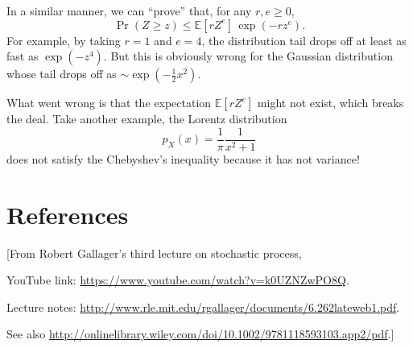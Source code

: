 \documentclass{article}
\begin{document}
In a similar manner, we can ``prove'' that, for any $r, e \ge 0$,
$$
\operatorname{Pr}(Z \ge z)
\le
\mathbb{E}[rZ^e] \, \exp(-rz^e).
$$
For example, by taking $r = 1$ and $e = 4$,
the distribution tail drops off at least as fast as $\exp(-z^4)$.
%
But this is obviously wrong for the Gaussian distribution
whose tail drops off as $\sim \exp\left( -\frac{1}{2} x^2 \right)$.

What went wrong is that the expectation $\mathbb{E}[rZ^e]$
might not exist, which breaks the deal.
%
Take another example, the Lorentz distribution
$$
p_X(x) = \frac{1}{\pi} \frac{1}{x^2 + 1}
$$
does not satisfy the Chebyshev's inequality because
it has not variance!

\section{References}

[From Robert Gallager's third lecture on stochastic process,

YouTube link: \url{https://www.youtube.com/watch?v=k0UZNZwPO8Q}.

Lecture notes: \url{http://www.rle.mit.edu/rgallager/documents/6.262lateweb1.pdf}.

See also \url{http://onlinelibrary.wiley.com/doi/10.1002/9781118593103.app2/pdf}.]
\end{document}
